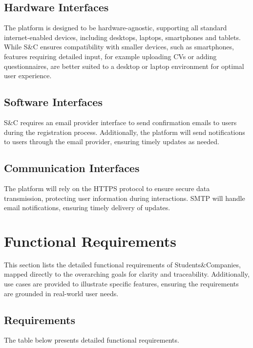 \subsection{Hardware Interfaces}
The platform is designed to be hardware-agnostic, supporting all standard internet-enabled devices, including desktops, laptops, smartphones and tablets.
While S\&C ensures compatibility with smaller devices, such as smartphones, features requiring detailed input, for example uploading CVs or adding questionnaires, are better suited to a desktop or laptop environment for optimal user experience.

\subsection{Software Interfaces}
S\&C requires an email provider interface to send confirmation emails to users during the registration process.
Additionally, the platform will send notifications to users through the email provider, ensuring timely updates as needed.

\subsection{Communication Interfaces}
The platform will rely on the HTTPS protocol to ensure secure data transmission, protecting user information during interactions.
SMTP will handle email notifications, ensuring timely delivery of updates.

\section{Functional Requirements}
This section lists the detailed functional requirements of Students\&Companies, mapped directly to the overarching goals for clarity and traceability.
Additionally, use cases are provided to illustrate specific features, ensuring the requirements are grounded in real-world user needs.

\subsection{Requirements}
The table below presents detailed functional requirements.

